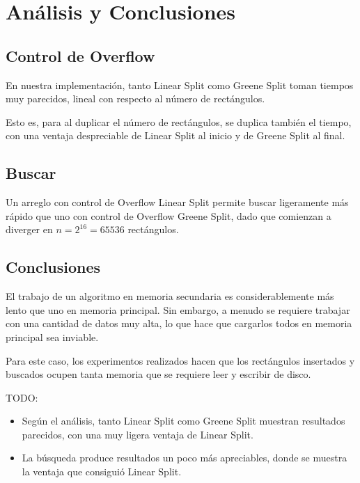 \documentclass[letterpaper,10pt]{article}
\begin{document}
	\newpage

	\section{Análisis y Conclusiones}

	\subsection{Control de Overflow}

	En nuestra implementación, tanto Linear Split como Greene Split toman tiempos muy parecidos, lineal con respecto al número de rectángulos.

	Esto es, para al duplicar el número de rectángulos, se duplica también el tiempo, con una ventaja despreciable de Linear Split al inicio y de Greene Split al final.

	\subsection{Buscar}

	Un arreglo con control de Overflow Linear Split permite buscar ligeramente más rápido que uno con control de Overflow Greene Split, dado que comienzan a diverger en
	$n = 2^{16} = 65536$ rectángulos.

	\subsection{Conclusiones}

	El trabajo de un algoritmo en memoria secundaria es considerablemente más lento que uno en memoria principal. Sin embargo, a menudo se requiere trabajar con una cantidad de datos
	muy alta, lo que hace que cargarlos todos en memoria principal sea inviable.

	Para este caso, los experimentos realizados hacen que los rectángulos insertados y buscados ocupen tanta memoria que se requiere leer y escribir de disco.

	TODO:
	\begin{itemize}
		\item Según el análisis, tanto Linear Split como Greene Split muestran resultados parecidos, con una muy ligera ventaja de Linear Split.
		\item La búsqueda produce resultados un poco más apreciables, donde se muestra la ventaja que consiguió Linear Split.
	\end{itemize}
\end{document}
